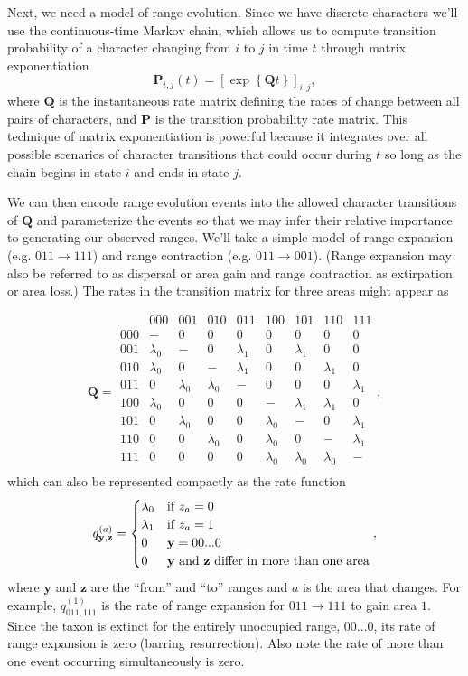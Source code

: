 \documentclass[11pt]{article}
\begin{document}
Next, we need a model of range evolution.
Since we have discrete characters we'll use the continuous-time Markov chain, which allows us to compute transition probability of a character changing from $i$ to $j$ in time $t$ through matrix exponentiation
\[
\mathbf{P}_{i,j}(t) = \left[ \exp \left\lbrace \mathbf{Q}t \right\rbrace \right]_{i,j},
\]
where $\textbf{Q}$ is the instantaneous rate matrix defining the rates of change between all pairs of characters, and $\textbf{P}$ is the transition probability rate matrix.
This technique of matrix exponentiation is powerful because it integrates over all possible scenarios of character transitions that could occur during $t$ so long as the chain begins in state $i$ and ends in state $j$.

We can then encode range evolution events into the allowed character transitions of $\textbf{Q}$ and parameterize the events so that we may infer their relative importance to generating our observed ranges.
We'll take a simple model of range expansion (e.g. $011 \rightarrow 111$) and range contraction (e.g. $011 \rightarrow 001$).
(Range expansion may also be referred to as dispersal or area gain and range contraction as extirpation or area loss.)
The rates in the transition matrix for three areas might appear as

\[
\textbf{Q} = 
	\begin{array}{r|cccccccc}
		& 000 & 001 & 010 & 011 & 100 & 101 & 110 & 111 \\
		\hline
		000 & - & 0 & 0 & 0 & 0 & 0 & 0 & 0 \\
		001 & \lambda_0 & - & 0 & \lambda_1 & 0 & \lambda_1 & 0 & 0 \\
		010 & \lambda_0 & 0 & - & \lambda_1 & 0 & 0 & \lambda_1 & 0 \\
		011 & 0 & \lambda_0 & \lambda_0 & - & 0 & 0 & 0 & \lambda_1 \\
		100 & \lambda_0 & 0 & 0 & 0 & - & \lambda_1 & \lambda_1 & 0 \\
		101 & 0 & \lambda_0 & 0 & 0 & \lambda_0 & - & 0 & \lambda_1 \\
		110 & 0 & 0 & \lambda_0 & 0 & \lambda_0 & 0 & - & \lambda_1 \\
		111 & 0 & 0 & 0 & 0 & \lambda_0 & \lambda_0 & \lambda_0 & - \\								
	\end{array},
\]
which can also be represented compactly as the rate function
\[
q^{(a)}_{\textbf{y},\textbf{z}} =
\begin{cases}
\lambda_0 & \text{if $z_a=0$}  \\
\lambda_1 & \text{if $z_a=1$} \\
0 & \mathbf{y} = 00...0 \\
0 & \text{\textbf{y} and \textbf{z} differ in more than one area}
\end{cases},
\]
where $\textbf{y}$ and $\textbf{z}$ are the ``from'' and ``to'' ranges and $a$ is the area that changes.
For example, $q^{(1)}_{011,111}$ is the rate of range expansion for $011 \rightarrow 111$ to gain area $1$.
Since the taxon is extinct for the entirely unoccupied range, $00...0$, its rate of range expansion is zero (barring resurrection).
Also note the rate of more than one event occurring simultaneously is zero.
\end{document}
